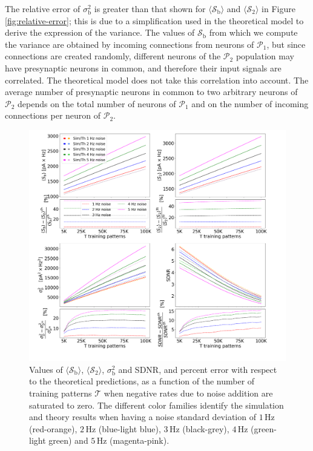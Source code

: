 \documentclass[a4paper, 12pt, twoside, openright]{book}
\newcommand{\popI}{\mathcal{P}_1}
\newcommand{\popII}{\mathcal{P}_2}
\newcommand{\T}{\mathcal{T}}
\newcommand{\SII}{\mathcal{S}_\text{2}}
\newcommand{\Sb}{\mathcal{S}_\text{b}}
\newcommand{\varSb}{\sigma^{2}_\text{b}}
\begin{document}
The relative error of $\varSb$ is greater than that shown for $\langle \Sb \rangle$ and $\langle \SII \rangle$ in Figure \ref{fig:relative-error}; this is due to a simplification used in the theoretical model to derive the expression of the variance.
The values of $\Sb$ from which we compute the variance are obtained by incoming connections 
from neurons of $\popI$, but since connections are created randomly, different neurons of the $\popII$ population may have presynaptic neurons in common, and therefore their input signals are correlated.
The theoretical model does not take this correlation into account.
The average number of presynaptic neurons in common to two arbitrary neurons of
$\popII$ depends on the total number of neurons of $\popI$ and on the number of incoming connections per neuron of $\popII$.

\begin{figure}[H]
\centering\includegraphics[width=\columnwidth]{figures/lognormal_saturation.png}
	\caption{ 
	Values of $\langle\Sb\rangle$, $\langle\SII\rangle$, $\varSb$ and SDNR, and percent error with respect to the theoretical predictions, as a function of the number of training patterns $\T$ when negative rates due to noise addition are saturated to zero.
    The different color families identify the simulation and theory results when having a noise standard deviation of $1$\,Hz (red-orange), $2$\,Hz (blue-light blue), $3$\,Hz (black-grey), $4$\,Hz (green-light green) and $5$\,Hz (magenta-pink).
	\label{fig:relative-error-saturation}}
\end{figure}
\end{document}
